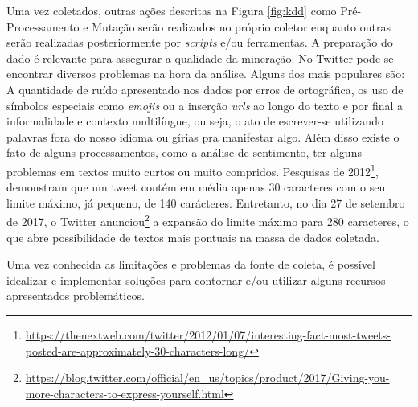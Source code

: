 Uma vez coletados, outras ações descritas na Figura \ref{fig:kdd} como Pré-Processamento e Mutação serão realizados no próprio coletor enquanto outras serão realizadas posteriormente por \textit{scripts} e/ou ferramentas. A preparação do dado é relevante para assegurar a qualidade da mineração. No Twitter pode-se encontrar diversos problemas na hora da análise. Alguns dos mais populares são: A quantidade de ruído apresentado nos dados por erros de ortográfica, os uso de símbolos especiais como \textit{emojis} ou a inserção \textit{urls} ao longo do texto e por final a informalidade e contexto multilíngue, ou seja, o ato de escrever-se utilizando palavras fora do nosso idioma ou gírias pra manifestar algo. Além disso existe o fato de alguns processamentos, como a análise de sentimento, ter alguns problemas em textos muito curtos ou muito compridos. Pesquisas de 2012\footnote{\url{https://thenextweb.com/twitter/2012/01/07/interesting-fact-most-tweets-posted-are-approximately-30-characters-long/}}, demonstram que um tweet contém em média apenas 30 caracteres com o seu limite máximo, já pequeno, de 140 carácteres. \cite[9-11]{silva2016analise} Entretanto, no dia 27 de setembro de 2017, o Twitter anunciou\footnote{\url{https://blog.twitter.com/official/en_us/topics/product/2017/Giving-you-more-characters-to-express-yourself.html}} a expansão do limite máximo para 280 caracteres, o que abre possibilidade de textos mais pontuais na massa de dados coletada.

Uma vez conhecida as limitações e problemas da fonte de coleta, é possível idealizar e implementar soluções para contornar e/ou utilizar alguns recursos apresentados problemáticos.
